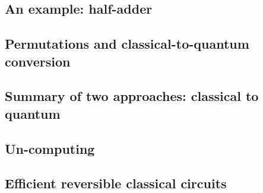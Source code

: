 \documentclass[main.tex]{subfiles}
\begin{document}
\subsection{An example: half-adder}

\subsection{Permutations and classical-to-quantum conversion}

\subsection{Summary of two approaches: classical to quantum}

\subsection{Un-computing}

\subsection{Efficient reversible classical circuits}
\end{document}
